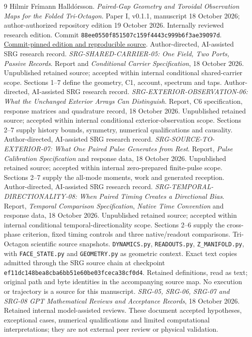 \begin{thebibliography}{9}
 Hilmir Fr\'imann Halld\'orsson. \emph{Paired-Gap Geometry and Toroidal Observation Maps for the Folded Tri-Octagon}. Paper I, v0.1.1, manuscript 18 October 2026; author-authorized repository edition 19 October 2026. Internally reviewed research edition. Commit \texttt{88ee0550f851507c159f4443c999b6f3ae39097d}. \href{https://github.com/pzychozen/trioctagon-physics/tree/88ee0550f851507c159f4443c999b6f3ae39097d/SRG_REDISCOVERY/PAPERS/PAIRED_GAP_GEOMETRY_OBSERVATION/publication/v0.1.1}{Commit-pinned edition and reproducible source}.
 Author-directed, AI-assisted SRG research record. \emph{SRG-SHARED-CARRIER-05: One Field, Two Ports, Passive Records}. Report and \emph{Conditional Carrier Specification}, 18 October 2026. Unpublished retained source; accepted within internal conditional shared-carrier scope. Sections 1--7 define the geometry, C1, account, spectrum and taps.
 Author-directed, AI-assisted SRG research record. \emph{SRG-EXTERIOR-OBSERVATION-06: What the Unchanged Exterior Arrays Can Distinguish}. Report, C6 specification, response matrices and quadrature record, 18 October 2026. Unpublished retained source; accepted within internal conditional exterior-observation scope. Sections 2--7 supply history bounds, symmetry, numerical qualifications and causality.
 Author-directed, AI-assisted SRG research record. \emph{SRG-SOURCE-TO-EXTERIOR-07: What One Paired Pulse Generates from Rest}. Report, \emph{Pulse Calibration Specification} and response data, 18 October 2026. Unpublished retained source; accepted within internal zero-prepared finite-pulse scope. Sections 2--7 supply the all-mode moments, work and generated reception.
 Author-directed, AI-assisted SRG research record. \emph{SRG-TEMPORAL-DIRECTIONALITY-08: When Paired Timing Creates a Directional Bias}. Report, \emph{Temporal Comparison Specification}, \emph{Native Time Convention} and response data, 18 October 2026. Unpublished retained source; accepted within internal conditional temporal-directionality scope. Sections 2--6 supply the cross-phase criterion, fixed timing controls and three native/readout comparisons.
 Tri-Octagon scientific source snapshots. \texttt{DYNAMICS.py}, \texttt{READOUTS.py}, \texttt{Z\_MANIFOLD.py}, with \texttt{FACE\_STATE.py} and \texttt{GEOMETRY.py} as geometric context. Exact text copies admitted through the SRG source chain at checkpoint \texttt{ef11dc148bea8cba6bb51e60be03fceca38cf0d4}. Retained definitions, read as text; original path and byte identities in the accompanying source map. No execution or trajectory is a source for this manuscript.
 \emph{SRG-05, SRG-06, SRG-07 and SRG-08 GPT Mathematical Reviews and Acceptance Records}, 18 October 2026. Retained internal model-assisted reviews. These document accepted hypotheses, exceptional cases, numerical qualifications and limited computational interpretations; they are not external peer review or physical validation.
\end{thebibliography}
